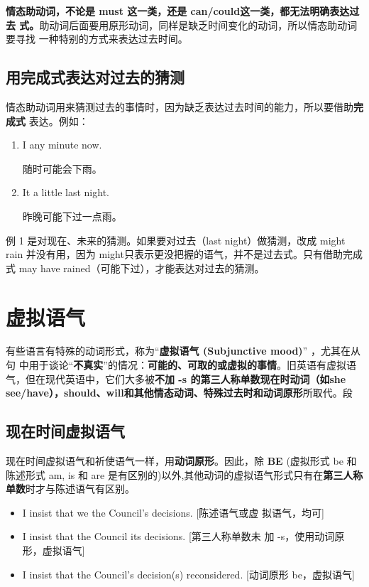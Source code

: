 \textbf{情态助动词，不论是 must 这一类，还是 can/could这一类，都无法明确表达过去
  式。}助动词后面要用原形动词，同样是缺乏时间变化的动词，所以情态助动词要寻找
一种特别的方式来表达过去时间。

\subsection{用完成式表达对过去的猜测}

情态助动词用来猜测过去的事情时，因为缺乏表达过去时间的能力，所以要借助\textbf{完成式}
表达。例如：
\begin{enumerate}
\item  I  any minute now.

  随时可能会下雨。
\item  It  a little last night.

  昨晚可能下过一点雨。
\end{enumerate}
例 1 是对现在、未来的猜测。如果要对过去（last night）做猜测，改成 might rain
并没有用，因为 might只表示更没把握的语气，并不是过去式。只有借助完成式 may
have rained（可能下过），才能表达对过去的猜测。

\section{虚拟语气}

有些语言有特殊的动词形式，称为“\textbf{虚拟语气 (Subjunctive mood)}” ，尤其在从句
中用于谈论“\textbf{不真实}”的情况：\textbf{可能的、可取的或虚拟的事情}。旧英语有虚拟语
气，但在现代英语中，它们大多被\textbf{不加 -s 的第三人称单数现在时动词（如she
  see/have），should、will和其他情态动词、特殊过去时和动词原形}所取代。段

\subsection{现在时间虚拟语气}

现在时间虚拟语气和祈使语气一样，用\textbf{动词原形}。因此，除 \textbf{BE} (虚拟形式 be 和
陈述形式 am, is 和 are 是有区别的)以外,其他动词的虚拟语气形式只有在\textbf{第三人称
  单数}时才与陈述语气有区别。

\begin{itemize}
\item I insist that we  the Council's decisions. [陈述语气或虚
  拟语气，均可]
\item I insist that the Council  its decisions. [第三人称单数未
  加 -s，使用动词原形，虚拟语气]
\item I insist that the Council's decision(s)  reconsidered. [动词原形
  be，虚拟语气]
\end{itemize}

